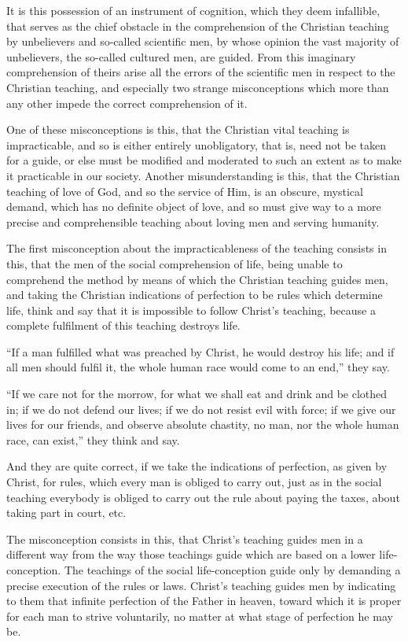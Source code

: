 \documentclass{book}
\begin{document}
It is this possession of an instrument of cognition, which they deem infallible, that serves as the chief obstacle in the comprehension of the Christian teaching by unbelievers and so-called scientific men, by whose opinion the vast majority of unbelievers, the so-called cultured men, are guided. From this imaginary comprehension of theirs arise all the errors of the scientific men in respect to the Christian teaching, and especially two strange misconceptions which more than any other impede the correct comprehension of it.

One of these misconceptions is this, that the Christian vital teaching is impracticable, and so is either entirely unobligatory, that is, need not be taken for a guide, or else must be modified and moderated to such an extent as to make it practicable in our society. Another misunderstanding is this, that the Christian teaching of love of God, and so the service of Him, is an obscure, mystical demand, which has no definite object of love, and so must give way to a more precise and comprehensible teaching about loving men and serving humanity.

The first misconception about the impracticableness of the teaching consists in this, that the men of the social comprehension of life, being unable to comprehend the method by means of which the Christian teaching guides men, and taking the Christian indications of perfection to be rules which determine life, think and say that it is impossible to follow Christ’s teaching, because a complete fulfilment of this teaching destroys life.

“If a man fulfilled what was preached by Christ, he would destroy his life; and if all men should fulfil it, the whole human race would come to an end,” they say.

“If we care not for the morrow, for what we shall eat and drink and be clothed in; if we do not defend our lives; if we do not resist evil with force; if we give our lives for our friends, and observe absolute chastity, no man, nor the whole human race, can exist,” they think and say.

And they are quite correct, if we take the indications of perfection, as given by Christ, for rules, which every man is obliged to carry out, just as in the social teaching everybody is obliged to carry out the rule about paying the taxes, about taking part in court, etc.

The misconception consists in this, that Christ’s teaching guides men in a different way from the way those teachings guide which are based on a lower life-conception. The teachings of the social life-conception guide only by demanding a precise execution of the rules or laws. Christ’s teaching guides men by indicating to them that infinite perfection of the Father in heaven, toward which it is proper for each man to strive voluntarily, no matter at what stage of perfection he may be.
\end{document}
